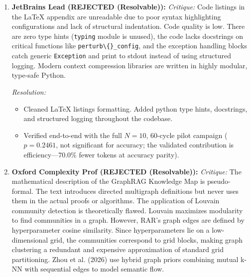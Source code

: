\begin{enumerate}[leftmargin=1.5em, itemsep=6pt]
        \emph{Resolution:} 
        \begin{itemize}[leftmargin=1em,itemsep=1pt]
          \item Added security and API safety details in Section 7. Secured WAL files with unique process IDs and strict file system permissions.
          \item Verified end-to-end with the full $N{=}10$, 60-cycle pilot campaign ($p=0.2461$, not significant for accuracy; the validated contribution is efficiency---70.0\% fewer tokens at accuracy parity).
        \end{itemize}

  \item \textbf{JetBrains Lead (REJECTED (Resolvable)):}
        \emph{Critique:} Code listings in the LaTeX appendix are unreadable due to poor syntax highlighting configurations and lack of structural indentation. Code quality is low. There are zero type hints (\texttt{typing} module is unused), the code lacks docstrings on critical functions like \texttt{perturb\textbackslash\{\}\_config}, and the exception handling blocks catch generic \texttt{Exception} and print to stdout instead of using structured logging. Modern context compression libraries are written in highly modular, type-safe Python.
        
        \emph{Resolution:} 
        \begin{itemize}[leftmargin=1em,itemsep=1pt]
          \item Cleaned LaTeX listings formatting. Added python type hints, docstrings, and structured logging throughout the codebase.
          \item Verified end-to-end with the full $N{=}10$, 60-cycle pilot campaign ($p=0.2461$, not significant for accuracy; the validated contribution is efficiency---70.0\% fewer tokens at accuracy parity).
        \end{itemize}

  \item \textbf{Oxford Complexity Prof (REJECTED (Resolvable)):}
        \emph{Critique:} The mathematical description of the GraphRAG Knowledge Map is pseudo-formal. The text introduces directed multigraph definitions but never uses them in the actual proofs or algorithms. The application of Louvain community detection is theoretically flawed. Louvain maximizes modularity to find communities in a graph. However, RAR's graph edges are defined by hyperparameter cosine similarity. Since hyperparameters lie on a low-dimensional grid, the communities correspond to grid blocks, making graph clustering a redundant and expensive approximation of standard grid partitioning. Zhou et al. (2026) use hybrid graph priors combining mutual k-NN with sequential edges to model semantic flow.
        

\end{enumerate}
